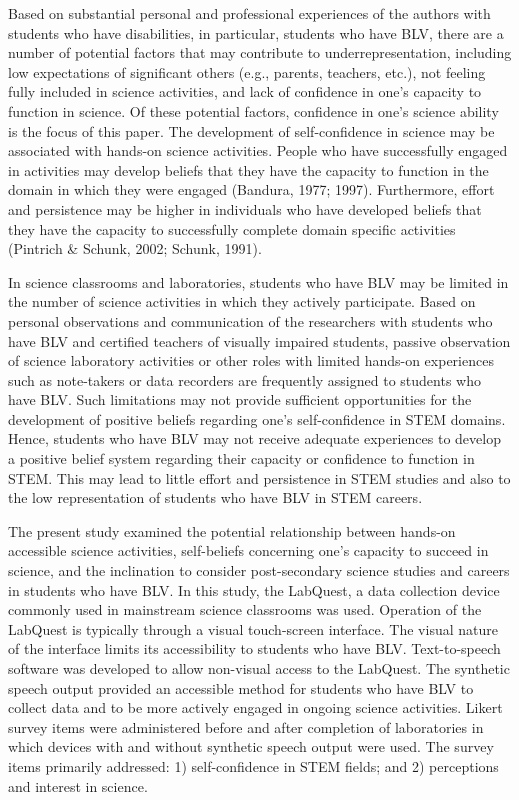 \documentclass[11.5pt]{sig-alternate} %
\begin{document}
\begin{large}
Based on substantial personal and professional experiences of the authors with students who have disabilities, in particular, students who have BLV, there are a number of potential factors that may contribute to underrepresentation, including low expectations of significant others (e.g., parents, teachers, etc.), not feeling fully included in science activities, and lack of confidence in one’s capacity to function in science. Of these potential factors, confidence in one’s science ability is the focus of this paper. The development of self-confidence in science may be associated with hands-on science activities. People who have successfully engaged in activities may develop beliefs that they have the capacity to function in the domain in which they were engaged (Bandura, 1977; 1997).  Furthermore, effort and persistence may be higher in individuals who have developed beliefs that they have the capacity to successfully complete domain specific activities (Pintrich \& Schunk, 2002; Schunk, 1991).  

In science classrooms and laboratories, students who have BLV may be limited in the number of science activities in which they actively participate. Based on personal observations and communication of the researchers with students who have BLV and certified teachers of visually impaired students, passive observation of science laboratory activities or other roles with  limited hands-on experiences such as note-takers or data recorders are frequently assigned to students who have BLV. Such limitations may not provide sufficient opportunities for the development of positive beliefs regarding one’s self-confidence in STEM domains. Hence, students who have BLV may not receive adequate experiences to develop a positive belief system regarding their capacity or confidence to function in STEM. This may lead to little effort and persistence in STEM studies and also to the low representation of students who have BLV in STEM careers. 

The present study examined the potential relationship between hands-on accessible science activities, self-beliefs concerning one’s capacity to succeed in science, and the inclination to consider post-secondary science studies and careers in students who have BLV. In this study, the LabQuest, a data collection device commonly used in mainstream science classrooms was used. Operation of the LabQuest is typically through a visual touch-screen interface. The visual nature of the interface limits its accessibility to students who have BLV. Text-to-speech software was developed to allow non-visual access to the LabQuest. The synthetic speech output provided an accessible method for students who have BLV to collect data and to be more actively engaged in ongoing science activities. Likert survey items were administered before and after completion of laboratories in which devices with and without synthetic speech output were used.  The survey items primarily addressed:  1) self-confidence in STEM fields; and 2) perceptions and interest in science. 


\end{large}
\end{document}
